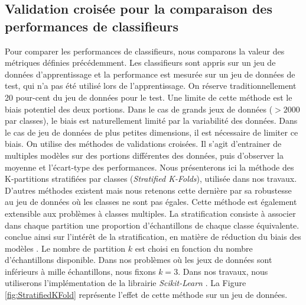 
\subsection{Validation croisée pour la comparaison des performances de classifieurs} \label{subsubsec:cross_val}
Pour comparer les performances de classifieurs, nous comparons la valeur des métriques définies précédemment.
Les classifieurs sont appris sur un jeu de données d'apprentissage et la performance est mesurée sur un jeu de données de test, qui n'a pas été utilisé lors de l'apprentissage.
On réserve traditionnellement 20 pour-cent du jeu de données pour le test.
Une limite de cette méthode est le biais potentiel des deux portions.
Dans le cas de grands jeux de données ($> 2 000$ par classes), le biais est naturellement limité par la variabilité des données.
Dans le cas de jeu de données de plus petites dimensions, il est nécessaire de limiter ce biais.
On utilise des méthodes de validations croisées.
Il s'agit d'entrainer de multiples modèles sur des portions différentes des données, puis d'observer la moyenne et l'écart-type des performances.
Nous présenterons ici la méthode des K-partitions stratifiées par classes (\textit{Stratified K-Folds}), utilisée dans nos travaux.
D'autres méthodes existent mais nous retenons cette dernière par sa robustesse au jeu de données où les classes ne sont pas égales.
Cette méthode est également extensible aux problèmes à classes multiples.
La stratification consiste à associer dans chaque partition une proportion d'échantillons de chaque classe équivalente.
\citeauthor{kohavi_study_1995} conclue ainsi sur l'intérêt de la stratification, en matière de réduction du biais des modèles \cite{kohavi_study_1995}.
Le nombre de partition $k$ est choisi en fonction du nombre d'échantillons disponible.
Dans nos problèmes où les jeux de données sont inférieurs à mille échantillons, nous fixons $k=3$.
Dans nos travaux, nous utiliserons l'implémentation de la librairie \textit{Scikit-Learn} \cite{pedregosa_scikit-learn_2011}.
La Figure \ref{fig:StratifiedKFold} représente l'effet de cette méthode sur un jeu de données.

